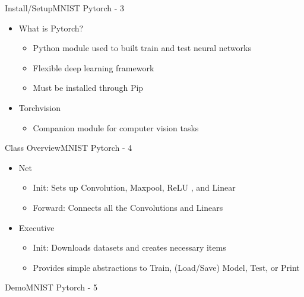 \documentclass{beamer}
\begin{document}
\begin{frame}{Install/Setup}{MNIST Pytorch - 3}
\begin{itemize}
    \item What is Pytorch? 
    \begin{itemize}
        \item Python module used to built train and test neural networks
        \item Flexible deep learning framework
        \item Must be installed through Pip
    \end{itemize}
        
    \item Torchvision 
    \begin{itemize}
        \item Companion module for computer vision tasks
    \end{itemize}
\end{itemize}
\end{frame}

\begin{frame}{Class Overview}{MNIST Pytorch - 4}
\begin{itemize}
    \item Net
    \begin{itemize}
        \item Init: Sets up Convolution, Maxpool, ReLU , and Linear
        \item Forward: Connects all the Convolutions and Linears 
    \end{itemize}
        
    \item Executive
    \begin{itemize}
        \item Init: Downloads datasets and creates necessary items
        \item Provides simple abstractions to Train, (Load/Save) Model, Test, or Print
    \end{itemize}
\end{itemize}
\end{frame}

\begin{frame}{Demo}{MNIST Pytorch - 5}
\end{frame}
\end{document}
